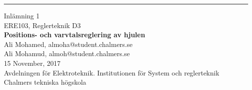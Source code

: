 \newcommand{\no}{1}
\newcommand{\subject}{Positions- och varvtalsreglering av hjulen}


\thispagestyle{empty}
\parbox[h!][\textheight][t]{\textwidth}{
\parbox[h!][\textheight][t]{0.19\textwidth}{

\vspace*{0.075\textheight}
\hspace*{0.15\textwidth}
\rule[\textheight]{1.5pt}{0.85\textheight}
}
\parbox[h!][0.85\textheight][t]{0.76\textwidth}{
\vspace{10em}

{\huge Inlämning \no} \\[0.1cm]
{\Large{ERE103, Reglerteknik D3}} \\[0.8cm]
{\Large \bf \subject} \\ [1cm]
{\Large Ali Mohamed, almoha@student.chalmers.se\\[0.3em]
Ali Mohamud, almoh@student.chalmers.se
\\[0.8cm]
15 November, 2017}
 \\[0.39\textheight]
Avdelningen för Elektroteknik. Institutionen för System och reglerteknik\\
Chalmers tekniska högskola
}}
\restoregeometry